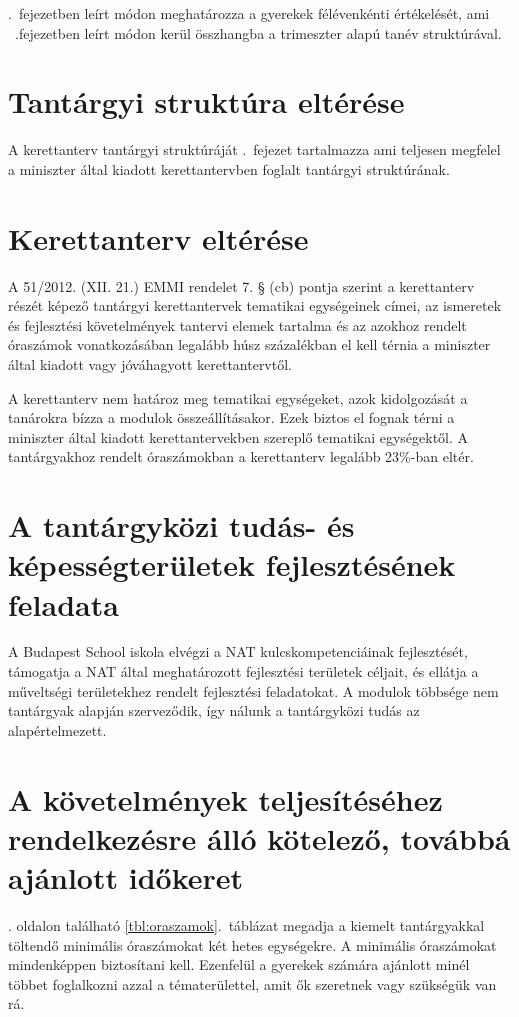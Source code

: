 .~fejezetben leírt módon meghatározza a gyerekek félévenkénti értékelését, ami ~.fejezetben leírt módon kerül összhangba a trimeszter alapú tanév struktúrával.

\section{Tantárgyi struktúra eltérése} 
A kerettanterv tantárgyi struktúráját .~fejezet tartalmazza ami teljesen megfelel a miniszter által kiadott kerettantervben foglalt tantárgyi struktúrának.

\section{Kerettanterv eltérése}
A 51/2012. (XII. 21.) EMMI rendelet 7. § (cb) pontja szerint a kerettanterv részét képező tantárgyi kerettantervek tematikai egységeinek címei, az ismeretek és fejlesztési követelmények tantervi elemek tartalma és az azokhoz rendelt óraszámok vonatkozásában legalább húsz százalékban el kell térnia a miniszter által kiadott vagy jóváhagyott kerettantervtől.

A kerettanterv nem határoz meg tematikai egységeket, azok kidolgozását a tanárokra bízza a modulok összeállításakor. Ezek biztos el fognak térni a miniszter által kiadott kerettantervekben szereplő tematikai egységektől. A tantárgyakhoz rendelt óraszámokban a kerettanterv legalább 23\%-ban eltér.


\section{A tantárgyközi tudás- és képességterületek fejlesztésének feladata}

A Budapest School iskola elvégzi a NAT kulcskompetenciáinak fejlesztését, támogatja a NAT által meghatározott fejlesztési területek céljait, és ellátja a műveltségi területekhez rendelt fejlesztési feladatokat. A modulok többsége nem tantárgyak alapján szerveződik, így nálunk a tantárgyközi tudás az alapértelmezett.

\section{A követelmények teljesítéséhez rendelkezésre álló kötelező, továbbá ajánlott időkeret}

. oldalon található \ref{tbl:oraszamok}.~táblázat
megadja a kiemelt tantárgyakkal töltendő minimális óraszámokat két hetes egységekre. A minimális óraszámokat mindenképpen biztosítani kell. 
Ezenfelül a gyerekek számára ajánlott minél többet foglalkozni azzal a tématerülettel, amit ők szeretnek vagy szükségük van rá.

